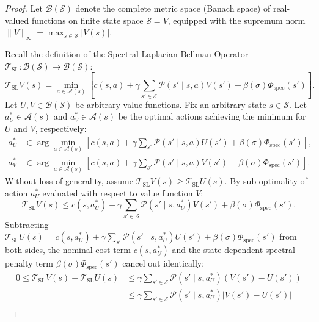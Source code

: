 \documentclass[11pt,a4paper]{article}
\begin{document}
\begin{proof}
Let $\mathcal{B}(\mathcal{S})$ denote the complete metric space (Banach space) of real-valued functions on finite state space $\mathcal{S} = V$, equipped with the supremum norm $\|V\|_\infty = \max_{s \in \mathcal{S}} |V(s)|$.

Recall the definition of the Spectral-Laplacian Bellman Operator $\mathcal{T}_{\text{SL}}: \mathcal{B}(\mathcal{S}) \to \mathcal{B}(\mathcal{S})$:
\begin{equation}
\mathcal{T}_{\text{SL}} V(s) = \min_{a \in \mathcal{A}(s)} \left[ c(s, a) + \gamma \sum_{s' \in \mathcal{S}} \mathcal{P}(s' \mid s, a) V(s') + \beta(\sigma) \Phi_{\text{spec}}(s') \right].
\end{equation}
Let $U, V \in \mathcal{B}(\mathcal{S})$ be arbitrary value functions. Fix an arbitrary state $s \in \mathcal{S}$. Let $a_U^* \in \mathcal{A}(s)$ and $a_V^* \in \mathcal{A}(s)$ be the optimal actions achieving the minimum for $U$ and $V$, respectively:
\begin{align}
a_U^* &\in \arg\min_{a \in \mathcal{A}(s)} \left[ c(s, a) + \gamma \sum_{s'} \mathcal{P}(s' \mid s, a) U(s') + \beta(\sigma) \Phi_{\text{spec}}(s') \right], \\
a_V^* &\in \arg\min_{a \in \mathcal{A}(s)} \left[ c(s, a) + \gamma \sum_{s'} \mathcal{P}(s' \mid s, a) V(s') + \beta(\sigma) \Phi_{\text{spec}}(s') \right].
\end{align}
Without loss of generality, assume $\mathcal{T}_{\text{SL}} V(s) \ge \mathcal{T}_{\text{SL}} U(s)$. By sub-optimality of action $a_U^*$ evaluated with respect to value function $V$:
\begin{equation}
\mathcal{T}_{\text{SL}} V(s) \le c(s, a_U^*) + \gamma \sum_{s' \in \mathcal{S}} \mathcal{P}(s' \mid s, a_U^*) V(s') + \beta(\sigma) \Phi_{\text{spec}}(s').
\end{equation}
Subtracting $\mathcal{T}_{\text{SL}} U(s) = c(s, a_U^*) + \gamma \sum_{s'} \mathcal{P}(s' \mid s, a_U^*) U(s') + \beta(\sigma) \Phi_{\text{spec}}(s')$ from both sides, the nominal cost term $c(s, a_U^*)$ and the state-dependent spectral penalty term $\beta(\sigma) \Phi_{\text{spec}}(s')$ cancel out identically:
\begin{align}
0 \le \mathcal{T}_{\text{SL}} V(s) - \mathcal{T}_{\text{SL}} U(s) &\le \gamma \sum_{s' \in \mathcal{S}} \mathcal{P}(s' \mid s, a_U^*) \left( V(s') - U(s') \right) \\
&\le \gamma \sum_{s' \in \mathcal{S}} \mathcal{P}(s' \mid s, a_U^*) \left| V(s') - U(s') \right| \\

\end{align}
\end{proof}
\end{document}
